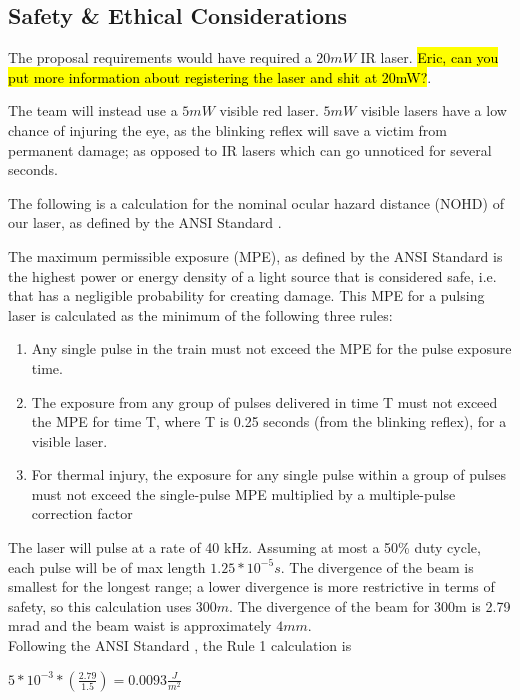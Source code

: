 \documentclass[openbib,letterpaper,10pt]{article}
\begin{document}
\begin{spacing}{1.15}
\section{Safety \& Ethical Considerations}
The proposal requirements would have required a $20mW$ IR laser. \hl{Eric, can you put more information about registering the laser and shit at 20mW?}. 

The team will instead use a $5mW$ visible red laser. $5mW$ visible lasers have a low chance of injuring the eye, as the blinking reflex will save a victim from permanent damage; as opposed to IR lasers which can go unnoticed for several seconds. 

The following is a calculation for the nominal ocular hazard distance (NOHD) of our laser, as defined by the ANSI Standard \cite{ANSI}.

The maximum permissible exposure (MPE), as defined by the ANSI Standard \cite{ANSI} is the highest power or energy density of a light source that is considered safe, i.e. that has a negligible probability for creating damage. This MPE for a pulsing laser is calculated as the minimum of the following three rules:

\begin{enumerate}
	\item Any single pulse in the train must not exceed the MPE for the pulse exposure time.
	\item The exposure from any group of pulses delivered in time T must not exceed the MPE for
	time T, where T is 0.25 seconds (from the blinking reflex), for a visible laser. 
	\item For thermal injury, the exposure for any single pulse within a group of pulses must not
	exceed the single-pulse MPE multiplied by a multiple-pulse correction factor
\end{enumerate}

The laser will pulse at a rate of 40 kHz. Assuming at most a 50\% duty cycle, each pulse will be of max length $1.25*10^{-5} s$. The divergence of the beam is smallest for the longest range; a lower divergence is more restrictive in terms of safety, so this calculation uses $300m$. The divergence of the beam for 300m is 2.79 mrad and the beam waist is approximately $4 mm$. \\

Following the ANSI Standard \cite{ANSI}, the Rule 1 calculation is 

{\large $5*10^{-3}*(\frac{2.79}{1.5})  = 0.0093 \frac{J}{m^2}$ }\\


\end{spacing}
\end{document}

